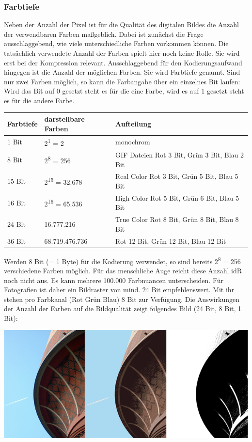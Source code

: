 \documentclass[11pt]{article}
\begin{document}
\subsubsection{Farbtiefe}
\label{sec:org0656861}
Neben der Anzahl der Pixel ist für die Qualität des digitalen Bildes die Anzahl der verwendbaren Farben maßgeblich. Dabei ist zunächst die Frage ausschlaggebend, wie viele unterschiedliche Farben vorkommen können. Die tatsächlich verwendete Anzahl der Farben spielt hier noch keine Rolle. Sie wird erst bei der Kompression relevant. Ausschlaggebend für den Kodierungsaufwand hingegen ist die Anzahl der möglichen Farben. Sie wird Farbtiefe genannt. Sind nur zwei Farben möglich, so kann die Farbangabe über ein einzelnes Bit laufen: Wird das Bit auf 0 gesetzt steht es für die eine Farbe, wird es auf 1 gesetzt steht es für die andere Farbe.
\begin{center}
\begin{tabular}{lll}
Farbtiefe & darstellbare Farben & Aufteilung\\
\hline
1 Bit & 2\textsuperscript{1} = 2 & monochrom\\
8 Bit & 2\textsuperscript{8} = 256 & GIF Dateien Rot 3 Bit, Grün 3 Bit, Blau 2 Bit\\
15 Bit & 2\textsuperscript{15} = 32.678 & Real Color Rot 3 Bit, Grün 5 Bit, Blau 5 Bit\\
16 Bit & 2\textsuperscript{16} = 65.536 & High Color Rot 5 Bit, Grün 6 Bit, Blau 5 Bit\\
24 Bit & 16.777.216 & True Color Rot 8 Bit, Grün 8 Bit, Blau 8 Bit\\
36 Bit & 68.719.476.736 & Rot 12 Bit, Grün 12 Bit, Blau 12 Bit\\
\end{tabular}
\end{center}
Werden 8 Bit (= 1 Byte) für die Kodierung verwendet, so sind bereits 2\textsuperscript{8} = 256 verschiedene Farben möglich. Für das menschliche Auge reicht diese Anzahl idR noch nicht aus. Es kann mehrere 100.000 Farbnuancen unterscheiden. Für Fotografien ist daher ein Bildraster von mind. 24 Bit empfehlenswert. Mit ihr stehen pro Farbkanal (Rot Grün Blau) 8 Bit zur Verfügung. Die Auswirkungen der Anzahl der Farben auf die Bildqualität zeigt folgendes Bild (24 Bit, 8 Bit, 1 Bit):
\begin{center}
\includegraphics[width=.9\linewidth]{./farbanzahl.jpg}
\end{center}
\end{document}
